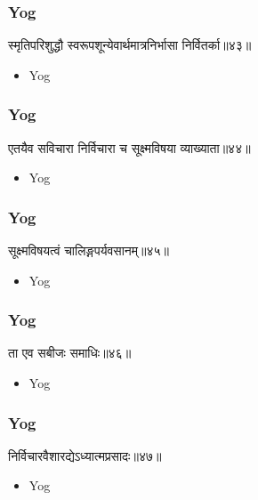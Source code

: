 \begin{frame}[fragile]\frametitle{Yog}
\begin{sanskrit}
स्मृतिपरिशुद्धौ स्वरूपशून्येवार्थमात्रनिर्भासा निर्वितर्का॥४३॥
\end{sanskrit}
	\begin{itemize}
	\item Yog 
	\end{itemize}
\end{frame}


\begin{frame}[fragile]\frametitle{Yog}
\begin{sanskrit}
एतयैव सविचारा निर्विचारा च सूक्ष्मविषया व्याख्याता॥४४॥
\end{sanskrit}
	\begin{itemize}
	\item Yog 
	\end{itemize}
\end{frame}


\begin{frame}[fragile]\frametitle{Yog}
\begin{sanskrit}
सूक्ष्मविषयत्वं चालिङ्गपर्यवसानम्॥४५॥
\end{sanskrit}
	\begin{itemize}
	\item Yog 
	\end{itemize}
\end{frame}

\begin{frame}[fragile]\frametitle{Yog}
\begin{sanskrit}
ता एव सबीजः समाधिः॥४६॥
\end{sanskrit}
	\begin{itemize}
	\item Yog 
	\end{itemize}
\end{frame}


\begin{frame}[fragile]\frametitle{Yog}
\begin{sanskrit}
निर्विचारवैशारद्येऽध्यात्मप्रसादः॥४७॥
\end{sanskrit}
	\begin{itemize}
	\item Yog 
	\end{itemize}
\end{frame}




